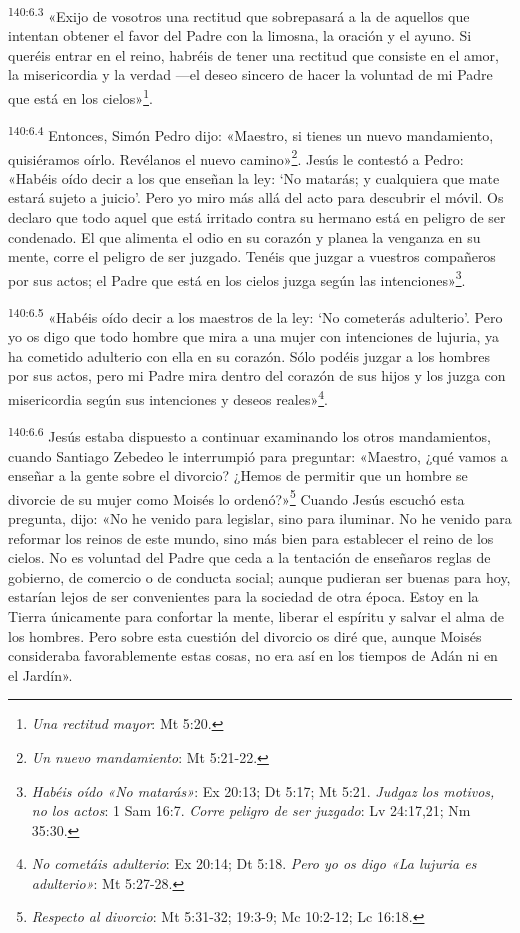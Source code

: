 \par 
\textsuperscript{140:6.3} «Exijo de vosotros una rectitud que sobrepasará a la de aquellos que intentan obtener el favor del Padre con la limosna, la oración y el ayuno. Si queréis entrar en el reino, habréis de tener una rectitud que consiste en el amor, la misericordia y la verdad ---el deseo sincero de hacer la voluntad de mi Padre que está en los cielos»\footnote{\textit{Una rectitud mayor}: Mt 5:20.}.

\par 
\textsuperscript{140:6.4} Entonces, Simón Pedro dijo: «Maestro, si tienes un nuevo mandamiento, quisiéramos oírlo. Revélanos el nuevo camino»\footnote{\textit{Un nuevo mandamiento}: Mt 5:21-22.}. Jesús le contestó a Pedro: «Habéis oído decir a los que enseñan la ley: `No matarás; y cualquiera que mate estará sujeto a juicio'. Pero yo miro más allá del acto para descubrir el móvil. Os declaro que todo aquel que está irritado contra su hermano está en peligro de ser condenado. El que alimenta el odio en su corazón y planea la venganza en su mente, corre el peligro de ser juzgado. Tenéis que juzgar a vuestros compañeros por sus actos; el Padre que está en los cielos juzga según las intenciones»\footnote{\textit{Habéis oído «No matarás»}: Ex 20:13; Dt 5:17; Mt 5:21. \textit{Judgaz los motivos, no los actos}: 1 Sam 16:7. \textit{Corre peligro de ser juzgado}: Lv 24:17,21; Nm 35:30.}.

\par 
\textsuperscript{140:6.5} «Habéis oído decir a los maestros de la ley: `No cometerás adulterio'. Pero yo os digo que todo hombre que mira a una mujer con intenciones de lujuria, ya ha cometido adulterio con ella en su corazón. Sólo podéis juzgar a los hombres por sus actos, pero mi Padre mira dentro del corazón de sus hijos y los juzga con misericordia según sus intenciones y deseos reales»\footnote{\textit{No cometáis adulterio}: Ex 20:14; Dt 5:18. \textit{Pero yo os digo «La lujuria es adulterio»}: Mt 5:27-28.}.

\par 
\textsuperscript{140:6.6} Jesús estaba dispuesto a continuar examinando los otros mandamientos, cuando Santiago Zebedeo le interrumpió para preguntar: «Maestro, ¿qué vamos a enseñar a la gente sobre el divorcio? ¿Hemos de permitir que un hombre se divorcie de su mujer como Moisés lo ordenó?»\footnote{\textit{Respecto al divorcio}: Mt 5:31-32; 19:3-9; Mc 10:2-12; Lc 16:18.} Cuando Jesús escuchó esta pregunta, dijo: «No he venido para legislar, sino para iluminar. No he venido para reformar los reinos de este mundo, sino más bien para establecer el reino de los cielos. No es voluntad del Padre que ceda a la tentación de enseñaros reglas de gobierno, de comercio o de conducta social; aunque pudieran ser buenas para hoy, estarían lejos de ser convenientes para la sociedad de otra época. Estoy en la Tierra únicamente para confortar la mente, liberar el espíritu y salvar el alma de los hombres. Pero sobre esta cuestión del divorcio os diré que, aunque Moisés consideraba favorablemente estas cosas, no era así en los tiempos de Adán ni en el Jardín».

